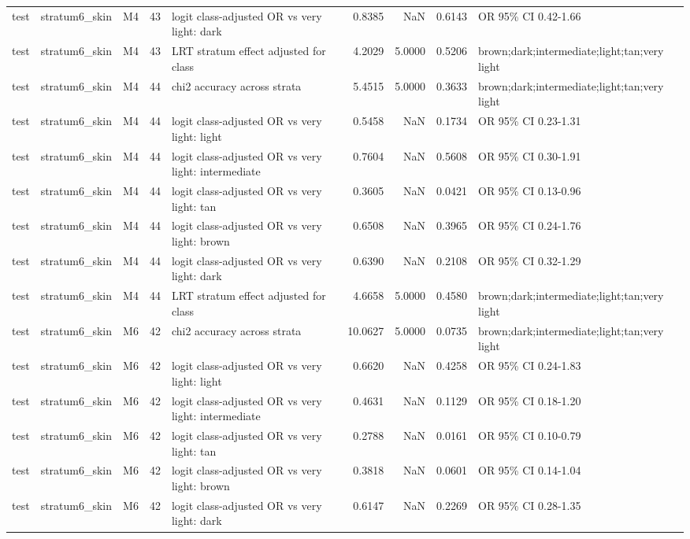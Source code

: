 \begin{tabular}{lllrlrrrl}
test & stratum6\_skin & M4 & 43 & logit class-adjusted OR vs very light: dark & 0.8385 & NaN & 0.6143 & OR 95\% CI 0.42-1.66 \\
test & stratum6\_skin & M4 & 43 & LRT stratum effect adjusted for class & 4.2029 & 5.0000 & 0.5206 & brown;dark;intermediate;light;tan;very light \\
test & stratum6\_skin & M4 & 44 & chi2 accuracy across strata & 5.4515 & 5.0000 & 0.3633 & brown;dark;intermediate;light;tan;very light \\
test & stratum6\_skin & M4 & 44 & logit class-adjusted OR vs very light: light & 0.5458 & NaN & 0.1734 & OR 95\% CI 0.23-1.31 \\
test & stratum6\_skin & M4 & 44 & logit class-adjusted OR vs very light: intermediate & 0.7604 & NaN & 0.5608 & OR 95\% CI 0.30-1.91 \\
test & stratum6\_skin & M4 & 44 & logit class-adjusted OR vs very light: tan & 0.3605 & NaN & 0.0421 & OR 95\% CI 0.13-0.96 \\
test & stratum6\_skin & M4 & 44 & logit class-adjusted OR vs very light: brown & 0.6508 & NaN & 0.3965 & OR 95\% CI 0.24-1.76 \\
test & stratum6\_skin & M4 & 44 & logit class-adjusted OR vs very light: dark & 0.6390 & NaN & 0.2108 & OR 95\% CI 0.32-1.29 \\
test & stratum6\_skin & M4 & 44 & LRT stratum effect adjusted for class & 4.6658 & 5.0000 & 0.4580 & brown;dark;intermediate;light;tan;very light \\
test & stratum6\_skin & M6 & 42 & chi2 accuracy across strata & 10.0627 & 5.0000 & 0.0735 & brown;dark;intermediate;light;tan;very light \\
test & stratum6\_skin & M6 & 42 & logit class-adjusted OR vs very light: light & 0.6620 & NaN & 0.4258 & OR 95\% CI 0.24-1.83 \\
test & stratum6\_skin & M6 & 42 & logit class-adjusted OR vs very light: intermediate & 0.4631 & NaN & 0.1129 & OR 95\% CI 0.18-1.20 \\
test & stratum6\_skin & M6 & 42 & logit class-adjusted OR vs very light: tan & 0.2788 & NaN & 0.0161 & OR 95\% CI 0.10-0.79 \\
test & stratum6\_skin & M6 & 42 & logit class-adjusted OR vs very light: brown & 0.3818 & NaN & 0.0601 & OR 95\% CI 0.14-1.04 \\
test & stratum6\_skin & M6 & 42 & logit class-adjusted OR vs very light: dark & 0.6147 & NaN & 0.2269 & OR 95\% CI 0.28-1.35 \\

\end{tabular}
